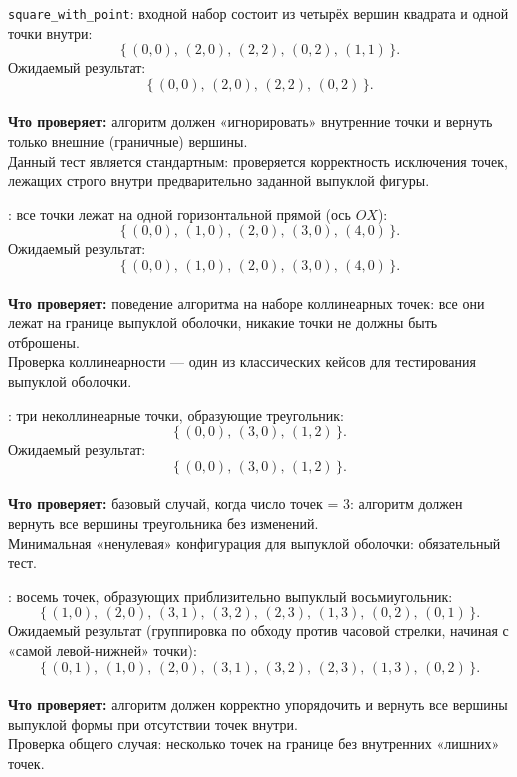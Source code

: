 \documentclass[12pt,a4paper]{article}
\begin{document}
\begin{description}
  \item\texttt{square\_with\_point}: входной набор состоит из четырёх вершин квадрата и одной точки внутри:
    \[
      \{\, (0,0),\,(2,0),\,(2,2),\,(0,2),\,(1,1) \,\}.
    \]
    Ожидаемый результат:
    \[
      \{\, (0,0),\,(2,0),\,(2,2),\,(0,2) \,\}.
    \]
    \\
    \textbf{Что проверяет:} 
    алгоритм должен «игнорировать» внутренние точки и вернуть только внешние (граничные) вершины.  
    \\
    Данный тест является стандартным: проверяется корректность исключения точек, лежащих строго внутри предварительно заданной выпуклой фигуры.

  \item[\texttt{ox\_line}]: все точки лежат на одной горизонтальной прямой (ось \(OX\)):
    \[
      \{\, (0,0),\,(1,0),\,(2,0),\,(3,0),\,(4,0) \,\}.
    \]
    Ожидаемый результат:
    \[
      \{\, (0,0),\,(1,0),\,(2,0),\,(3,0),\,(4,0) \,\}.
    \]
    \\
    \textbf{Что проверяет:} 
    поведение алгоритма на наборе коллинеарных точек: все они лежат на границе выпуклой оболочки, никакие точки не должны быть отброшены.  
    \\
    Проверка коллинеарности — один из классических кейсов для тестирования выпуклой оболочки.

  \item[\texttt{triangle}]: три неколлинеарные точки, образующие треугольник:
    \[
      \{\, (0,0),\,(3,0),\,(1,2) \,\}.
    \]
    Ожидаемый результат:
    \[
      \{\, (0,0),\,(3,0),\,(1,2) \,\}.
    \]
    \\
    \textbf{Что проверяет:} 
    базовый случай, когда число точек = 3: алгоритм должен вернуть все вершины треугольника без изменений.  
    \\
    Минимальная «ненулевая» конфигурация для выпуклой оболочки: обязательный тест.

  \item[\texttt{octagone}]: восемь точек, образующих приблизительно выпуклый восьмиугольник:
    \[
      \{\, (1,0),\,(2,0),\,(3,1),\,(3,2),\,(2,3),\,(1,3),\,(0,2),\,(0,1) \,\}.
    \]
    Ожидаемый результат (группировка по обходу против часовой стрелки, начиная с «самой левой-нижней» точки):
    \[
      \{\, (0,1),\,(1,0),\,(2,0),\,(3,1),\,(3,2),\,(2,3),\,(1,3),\,(0,2) \,\}.
    \]
    \\
    \textbf{Что проверяет:} 
    алгоритм должен корректно упорядочить и вернуть все вершины выпуклой формы при отсутствии точек внутри.  
    \\
    Проверка общего случая: несколько точек на границе без внутренних «лишних» точек.


\end{description}
\end{document}
